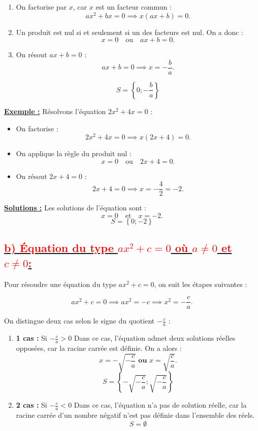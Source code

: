 \documentclass[12pt]{article}
\newcounter{solution}
\begin{document}
\begin{enumerate}
    \item On factorise par \( x \), car \( x \) est un facteur commun :
    \[
    ax^2 + bx = 0 \implies x (ax + b) = 0.
    \]
    \item Un produit est nul si et seulement si un des facteurs est nul. On a donc :
    \[
    x = 0 \quad \text{ou} \quad ax + b = 0.
    \]
    \item On résout \( ax + b = 0 \) :
    \[
    ax + b = 0 \implies x = -\frac{b}{a}.
    \]

		\[
    S=\left\lbrace 0;-\frac{b}{a}\right\rbrace 
    \]    
    
\end{enumerate}

\textbf{\underline{Exemple :}}  
Résolvons l'équation \( 2x^2 + 4x = 0 \) :

\begin{itemize}
    \item On factorise :
    \[
    2x^2 + 4x = 0 \implies x (2x + 4) = 0.
    \]
    \item On applique la règle du produit nul :
    \[
    x = 0 \quad \text{ou} \quad 2x + 4 = 0.
    \]
    \item On résout \( 2x + 4 = 0 \) :
    \[
    2x + 4 = 0 \implies x = -\frac{4}{2} = -2.
    \]
\end{itemize}

\textbf{\underline{Solutions :}}  
Les solutions de l'équation sont :
\[
x = 0 \quad \text{et} \quad x = -2.
\]
		\[
    S=\left\lbrace 0;-2\right\rbrace 
    \] 

\subsection*{\underline{\textbf{\textcolor{red}{b) Équation du type \( ax^2 + c = 0 \) où \( a \neq 0 \) et \( c \neq 0 \):}}}}

Pour résoudre une équation du type \( ax^2 + c = 0 \), on suit les étapes suivantes :

\[
ax^2 + c = 0 \implies ax^2 = -c \implies x^2 = -\frac{c}{a}.
\]

On distingue deux cas selon le signe du quotient \( -\frac{c}{a} \) :

\begin{enumerate}
    \item \textbf{1 cas :} Si \( -\frac{c}{a} > 0 \)  
    Dans ce cas, l'équation admet deux solutions réelles opposées, car la racine carrée est définie.  
    On a alors :
    \[
    x = - \sqrt{-\frac{c}{a}} \textbf{ ou } x =  \sqrt{\frac{c}{a}}.
    \]
		\[
    S=\left\lbrace - \sqrt{-\frac{c}{a}}; \sqrt{-\frac{c}{a}}\right\rbrace 
    \]
    \item \textbf{2 cas :} Si \( -\frac{c}{a} < 0 \)  
    Dans ce cas, l'équation n'a pas de solution réelle, car la racine carrée d'un nombre négatif n'est pas définie dans l'ensemble des réels.
    \[
    S=\emptyset
    \]
\end{enumerate}
\end{document}
